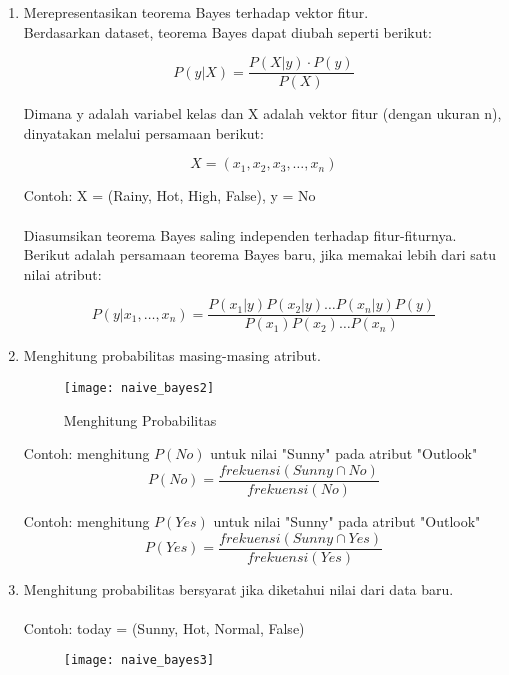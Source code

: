 \begin{enumerate}
\item Merepresentasikan teorema Bayes terhadap vektor fitur.\\
Berdasarkan dataset, teorema Bayes dapat diubah seperti berikut:

\begin{equation}
P(y|X) = \frac{P(X|y) \cdot P(y)}{P(X)}
\end{equation}

Dimana y adalah variabel kelas dan X adalah vektor fitur (dengan ukuran n), dinyatakan melalui persamaan berikut:

\begin{equation}
X = (x_1, x_2, x_3, \ldots, x_n)
\end{equation}

Contoh: X = (Rainy, Hot, High, False), y = No
\\\\
Diasumsikan teorema Bayes saling independen terhadap fitur-fiturnya. Berikut adalah persamaan teorema Bayes baru, jika memakai lebih dari satu nilai atribut:

\begin{equation}
P(y|x_1,\ldots,x_n) = \frac{P(x_1|y) P(x_2|y) \ldots P(x_n|y) P(y)}{P(x_1) P(x_2) \ldots P(x_n)}
\end{equation}


\item Menghitung probabilitas masing-masing atribut.

\begin{figure}[H]
	\centering
	\texttt{[image: naive\_bayes2]}
	\caption{Menghitung Probabilitas}
	\label{fig:naive_bayes2}
\end{figure}

Contoh: menghitung $P(No)$ untuk nilai "Sunny" pada atribut "Outlook"
\begin{equation}
P(No) = \frac{frekuensi(Sunny \cap No)}{frekuensi(No)}
\end{equation}

Contoh: menghitung $P(Yes)$ untuk nilai "Sunny" pada atribut "Outlook"
\begin{equation}
P(Yes) = \frac{frekuensi(Sunny \cap Yes)}{frekuensi(Yes)}
\end{equation}

\item Menghitung probabilitas bersyarat jika diketahui nilai dari data baru. \\\\
Contoh: today = (Sunny, Hot, Normal, False)
\begin{figure}[H]
	\centering
	\texttt{[image: naive\_bayes3]}
	\label{fig:naive_bayes3}
\end{figure}


\end{enumerate}
